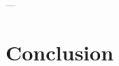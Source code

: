 \documentclass[12pt]{article}
\begin{document}


---


\section{Conclusion}








\printbibliography
\end{document}
